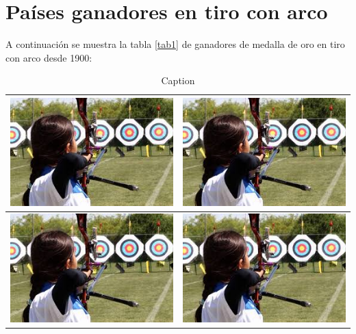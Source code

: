 \documentclass[12pt, legalpaper]{article}
\begin{document}
\newpage

\section{Países ganadores en tiro con arco}

A continuación se muestra la tabla \ref{tab1} de ganadores de medalla de oro en tiro con arco desde 1900:

\begin{table}[H]
    \centering
    \begin{tabular}{|c|c|}
    \hline
      \includegraphics[scale=.35, angle=0]{tiro_arco.jpg}    &  \includegraphics[scale=.35, angle=0]{tiro_arco.jpg}  \\
      \hline
      \includegraphics[scale=.35, angle=0]{tiro_arco.jpg}   & \includegraphics[scale=.35, angle=0]{tiro_arco.jpg}
    \end{tabular}
    \caption{Caption}
    \label{tab:my_label}
\end{table}
\end{document}
